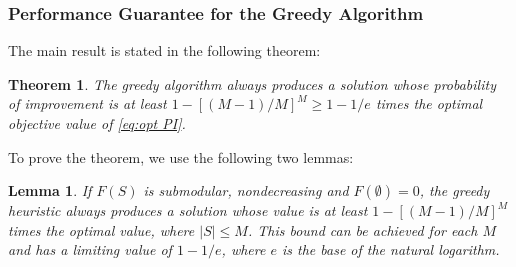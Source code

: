 \documentclass[11pt]{article}
\newtheorem{theorem}{Theorem}
\newtheorem{lemma}{Lemma}
\begin{document}
\subsubsection{Performance Guarantee for the Greedy Algorithm} \label{sec:lower bound}
The main result is stated in the following theorem:
\begin{theorem} 
  The greedy algorithm always produces a solution whose probability of improvement is at 
  least $1-[(M-1)/M]^M \geq 1 - 1 / e$ times the optimal objective
  value of \eqref{eq:opt PI}.
\end{theorem}
To prove the theorem, we use the following two lemmas:
\begin{lemma} \citep{nemhauser1978analysis}
  If $F(S)$ is submodular, nondecreasing and $F(\emptyset)=0$, the greedy heuristic always 
  produces a solution whose value is at least $1-[(M-1)/M]^M$ times the optimal value, where 
  $|S| \leq M$. This bound can be achieved for each $M$ and has a limiting value of $1-1/e$, 
  where $e$ is the base of the natural logarithm.
\end{lemma}
\end{document}

